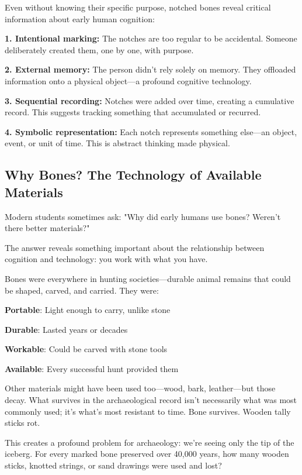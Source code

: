 \begin{keyidea}
	Even without knowing their specific purpose, notched bones reveal critical information about early human cognition:
	
	\textbf{1. Intentional marking:} The notches are too regular to be accidental. Someone deliberately created them, one by one, with purpose.
	
	\textbf{2. External memory:} The person didn't rely solely on memory. They offloaded information onto a physical object—a profound cognitive technology.
	
	\textbf{3. Sequential recording:} Notches were added over time, creating a cumulative record. This suggests tracking something that accumulated or recurred.
	
	\textbf{4. Symbolic representation:} Each notch represents something else—an object, event, or unit of time. This is abstract thinking made physical.
\end{keyidea}

\subsection{Why Bones? The Technology of Available Materials}

Modern students sometimes ask: "Why did early humans use bones? Weren't there better materials?"

The answer reveals something important about the relationship between cognition and technology: you work with what you have.

Bones were everywhere in hunting societies—durable animal remains that could be shaped, carved, and carried. They were:
\begin{compactitem}
	\item \textbf{Portable}: Light enough to carry, unlike stone
	\item \textbf{Durable}: Lasted years or decades
	\item \textbf{Workable}: Could be carved with stone tools
	\item \textbf{Available}: Every successful hunt provided them
\end{compactitem}

Other materials might have been used too—wood, bark, leather—but those decay. What survives in the archaeological record isn't necessarily what was most commonly used; it's what's most resistant to time. Bone survives. Wooden tally sticks rot.

This creates a profound problem for archaeology: we're seeing only the tip of the iceberg. For every marked bone preserved over 40,000 years, how many wooden sticks, knotted strings, or sand drawings were used and lost?

